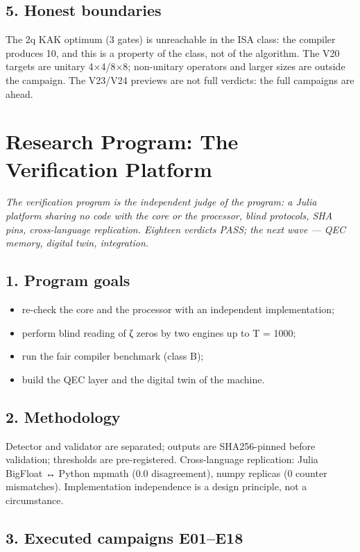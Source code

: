 \documentclass[11pt,a4paper]{article}
\begin{document}
\subsection{5. Honest boundaries}

The 2q KAK optimum (3 gates) is unreachable in the ISA class: the compiler produces 10, and this is a property of the class, not of the algorithm. The V20 targets are unitary 4×4/8×8; non-unitary operators and larger sizes are outside the campaign. The V23/V24 previews are not full verdicts: the full campaigns are ahead.

\section{Research Program: The Verification Platform}

\noindent\textit{\color{copper}The verification program is the independent judge of the program: a Julia platform sharing no code with the core or the processor, blind protocols, SHA pins, cross-language replication. Eighteen verdicts PASS; the next wave — QEC memory, digital twin, integration.}

\subsection{1. Program goals}

\begin{itemize}
  \item re-check the core and the processor with an independent implementation;
  \item perform blind reading of ζ zeros by two engines up to T = 1000;
  \item run the fair compiler benchmark (class B);
  \item build the QEC layer and the digital twin of the machine.
\end{itemize}

\subsection{2. Methodology}

Detector and validator are separated; outputs are SHA256-pinned before validation; thresholds are pre-registered. Cross-language replication: Julia BigFloat ↔ Python mpmath (0.0 disagreement), numpy replicas (0 counter mismatches). Implementation independence is a design principle, not a circumstance.

\subsection{3. Executed campaigns E01–E18}
\end{document}

